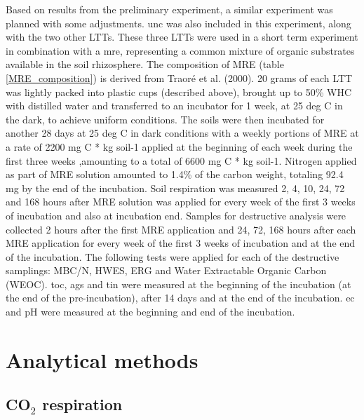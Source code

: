 \documentclass[12pt]{report}
\begin{document}
		Based on results from the preliminary experiment, a similar experiment was planned with some adjustments. \gls{unc} was also included in this experiment, along with the two other LTTs.
		These three LTTs were used in a short term experiment in combination with a \gls{mre}, representing a common mixture of organic substrates available in the soil rhizosphere. The composition of MRE (table \ref{MRE_composition}) is derived from Traoré et al. (2000).
		20 grams of each LTT was lightly packed into plastic cups (described above), brought up to 50\% WHC with distilled water and transferred to an incubator for 1 week, at 25 deg C in the dark, to achieve uniform conditions. The soils were then incubated for another 28 days at 25 deg C in dark conditions with a weekly portions of MRE at a rate of 2200 mg C * kg soil-1  applied at the beginning of each week during the first three weeks ,amounting to a total of 6600 mg C * kg soil-1. Nitrogen applied as part of MRE solution amounted to 1.4\% of the carbon weight,  totaling 92.4 mg by the end of the incubation. Soil respiration was measured 2, 4, 10, 24, 72 and 168 hours after MRE solution was applied for every week of the first 3 weeks of incubation and also at incubation end. Samples for destructive analysis were collected 2 hours after the first MRE application and 24, 72, 168 hours after  each MRE application for every week of the first 3 weeks of incubation and at the end of the incubation. The following tests were applied for each of the destructive samplings: MBC/N, HWES, ERG and Water Extractable Organic Carbon (WEOC). \gls{toc}, \gls{ags} and \gls{tin} were measured at the beginning of the incubation (at the end of the pre-incubation), after 14 days and at the end of the incubation. \gls{ec} and pH were measured at the beginning and end of the incubation.
		
		
		
		
		\section{Analytical methods}
		
		\subsection{CO$_2$ respiration}
		
\end{document}
